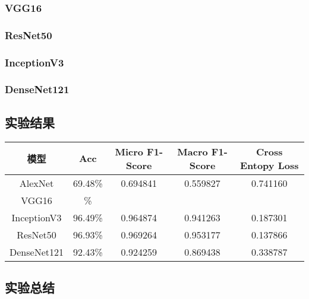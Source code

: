 \documentclass[UTF8]{ctexart}
\begin{document}
\subsubsection{VGG16}

\subsubsection{ResNet50}

\subsubsection{InceptionV3}

\subsubsection{DenseNet121}


\subsection{实验结果}

\begin{center}
    \begin{tabular}{||c c c c c||}
    \hline
    模型 & Acc & Micro F1-Score & Macro F1-Score & Cross Entopy Loss\\ [0.5ex]
    \hline
    AlexNet & 69.48\% &  0.694841& 0.559827&0.741160\\
    VGG16 & \% &  & &\\
    InceptionV3 & 96.49\% & 0.964874 & 0.941263& 0.187301\\
    ResNet50 & 96.93\% & 0.969264 & 0.953177 & 0.137866\\
    DenseNet121 & 92.43\% &  0.924259 & 0.869438&0.338787\\
    \hline
   \end{tabular}
   \end{center}
\subsection{实验总结}
\end{document}
